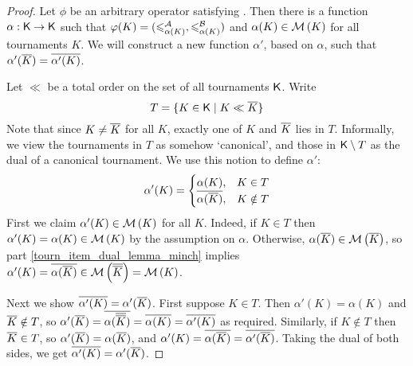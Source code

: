 \begin{proof}
    Let $\phi$ be an arbitrary operator satisfying \chainmin{}. Then
    there is a function $\alpha: \mathsf{K} \to \mathsf{K}$ such that $\varphi(K) =
    ({\leqslant^{\mathcal{A}}_{\alpha(K)}}, {\leqslant^{\mathcal{B}}_{\alpha(K)}})$ and $\alpha(K) \in \operatorname{\mathcal{M}}\left({K}\right)$
    for all tournaments $K$. We will construct a new function $\alpha'$, based
    on $\alpha$, such that $\alpha'({\overline{K}}) = {\overline{\alpha'(K)}}$.

    Let $\ll$ be a total order on the set of all tournaments
    $\mathsf{K}$.\footnotemark{} Write
    \[
        T = \{K \in \mathsf{K} \mid K \ll {\overline{K}}\}
    \]
    Note that since $K \ne {\overline{K}}$ for all $K$, exactly one of $K$ and
    ${\overline{K}}$ lies in $T$. Informally, we view the tournaments in $T$ as
    somehow `canonical', and those in $\mathsf{K} \setminus T$ as the dual of a
    canonical tournament. We use this notion to define $\alpha'$:
    \[
        \alpha'(K) = \begin{cases}
            \alpha(K),& K \in T \\
            {\overline{\alpha({\overline{K}})}},& K \notin T
        \end{cases}
    \]
    First we claim $\alpha'(K) \in \operatorname{\mathcal{M}}\left({K}\right)$ for all $K$. Indeed, if $K \in T$
    then $\alpha'(K) = \alpha(K) \in \operatorname{\mathcal{M}}\left({K}\right)$ by the assumption on $\alpha$.
    Otherwise, $\alpha({\overline{K}}) \in \operatorname{\mathcal{M}}\left({{\overline{K}}}\right)$, so
     part \cref{tourn_item_dual_lemma_minch}
    implies $\alpha'(K) = {\overline{\alpha({\overline{K}})}} \in \operatorname{\mathcal{M}}\left({{\overline{{\overline{K}}}}}\right) =
    \operatorname{\mathcal{M}}\left({K}\right)$.

    Next we show ${\overline{\alpha'(K)}} = \alpha'({\overline{K}})$. First suppose $K \in
    T$. Then $\alpha'(K) = \alpha(K)$ and ${\overline{K}} \notin T$, so
    $\alpha'({\overline{K}}) = {\overline{\alpha({\overline{{\overline{K}}}})}} = {\overline{\alpha(K)}} =
    {\overline{\alpha'(K)}}$ as required. Similarly, if $K \notin T$ then ${\overline{K}}
    \in T$, so $\alpha'({\overline{K}}) = \alpha({\overline{K}})$, and $\alpha'(K) =
    {\overline{\alpha({\overline{K}})}} = {\overline{\alpha'({\overline{K}})}}$. Taking the dual of
    both sides, we get ${\overline{\alpha'(K)}} = \alpha'({\overline{K}})$.


\end{proof}
